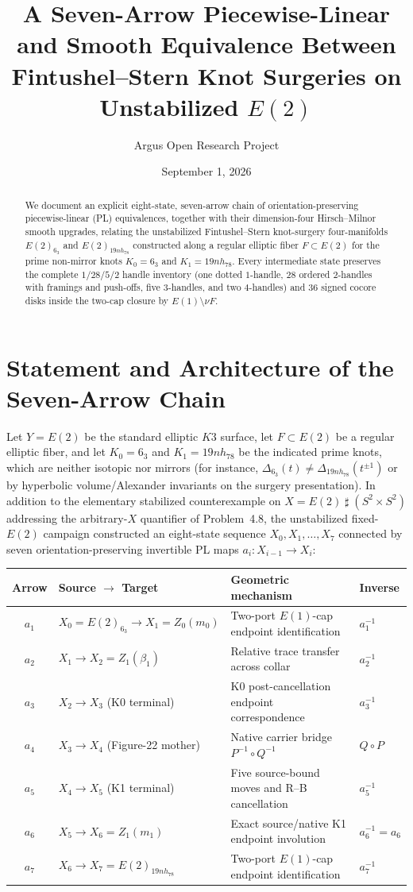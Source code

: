 \documentclass[10pt,reqno]{amsart}
\title[Unstabilized $E(2)$ Knot-Surgery Equivalence via Seven PL/Smooth Arrows]
{A Seven-Arrow Piecewise-Linear and Smooth Equivalence Between Fintushel--Stern Knot Surgeries on Unstabilized $E(2)$}
\author{Argus Open Research Project}
\date{September 1, 2026}
\theoremstyle{definition}
\begin{document}
\begin{abstract}
We document an explicit eight-state, seven-arrow chain of orientation-preserving piecewise-linear (PL) equivalences, together with their dimension-four Hirsch--Milnor smooth upgrades, relating the unstabilized Fintushel--Stern knot-surgery four-manifolds $E(2)_{6_3}$ and $E(2)_{19nh_{78}}$ constructed along a regular elliptic fiber $F\subset E(2)$ for the prime non-mirror knots $K_0=6_3$ and $K_1=19nh_{78}$. Every intermediate state preserves the complete $1/28/5/2$ handle inventory (one dotted $1$-handle, $28$ ordered $2$-handles with framings and push-offs, five $3$-handles, and two $4$-handles) and $36$ signed cocore disks inside the two-cap closure by $E(1)\setminus\nu F$.
\end{abstract}

\maketitle

\section{Statement and Architecture of the Seven-Arrow Chain}

Let $Y=E(2)$ be the standard elliptic $K3$ surface, let $F\subset E(2)$ be a regular elliptic fiber, and let $K_0=6_3$ and $K_1=19nh_{78}$ be the indicated prime knots, which are neither isotopic nor mirrors (for instance, $\Delta_{6_3}(t)\neq\Delta_{19nh_{78}}(t^{\pm 1})$ or by hyperbolic volume/Alexander invariants on the surgery presentation). In addition to the elementary stabilized counterexample on $X=E(2)\mathbin{\sharp}(S^2\times S^2)$ addressing the arbitrary-$X$ quantifier of Problem~4.8, the unstabilized fixed-$E(2)$ campaign constructed an eight-state sequence $X_0,X_1,\dots,X_7$ connected by seven orientation-preserving invertible PL maps $a_i:X_{i-1}\to X_i$:
\begin{center}
\begin{tabular}{clll}
\toprule
Arrow & Source $\to$ Target & Geometric mechanism & Inverse \\
\midrule
$a_1$ & $X_0=E(2)_{6_3}\to X_1=Z_0(m_0)$ & Two-port $E(1)$-cap endpoint identification & $a_1^{-1}$ \\
$a_2$ & $X_1\to X_2=Z_1(\beta_1)$ & Relative trace transfer across collar & $a_2^{-1}$ \\
$a_3$ & $X_2\to X_3$ (K0 terminal) & K0 post-cancellation endpoint correspondence & $a_3^{-1}$ \\
$a_4$ & $X_3\to X_4$ (Figure-22 mother) & Native carrier bridge $P^{-1}\circ Q^{-1}$ & $Q\circ P$ \\
$a_5$ & $X_4\to X_5$ (K1 terminal) & Five source-bound moves and R--B cancellation & $a_5^{-1}$ \\
$a_6$ & $X_5\to X_6=Z_1(m_1)$ & Exact source/native K1 endpoint involution & $a_6^{-1}=a_6$ \\
$a_7$ & $X_6\to X_7=E(2)_{19nh_{78}}$ & Two-port $E(1)$-cap endpoint identification & $a_7^{-1}$ \\
\bottomrule
\end{tabular}
\end{center}
\end{document}
